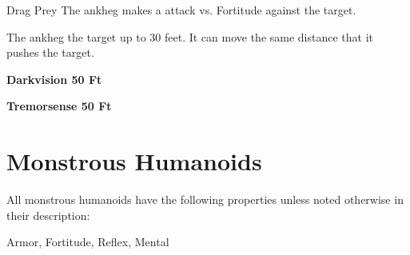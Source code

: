     \begin{freeability}{Drag Prey}
       The ankheg makes a  attack
        vs. Fortitude against the target.
    
    \hit The ankheg  the target up to 30 feet.
          It can move the same distance that it pushes the target.
    \end{freeability}
  
      \par \textbf{Darkvision 50 Ft}
    \par \textbf{Tremorsense 50 Ft}
  
        \section{Monstrous Humanoids}

        All monstrous humanoids have the following properties unless noted otherwise in their description:
        
    
     Armor,
     Fortitude,
     Reflex,
     Mental
  
  
      
